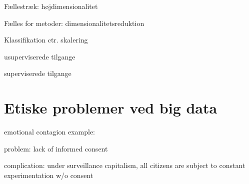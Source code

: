 \documentclass[12pt,]{article}
\begin{document}
Fællestræk: højdimensionalitet

Fælles for metoder: dimensionalitetsreduktion

Klassifikation ctr. skalering

usuperviserede tilgange

superviserede tilgange

\hypertarget{etiske-problemer-ved-big-data}{%
\section{Etiske problemer ved big
data}\label{etiske-problemer-ved-big-data}}

emotional contagion example: \citet{kramer2014experimental}

problem: lack of informed consent

complication: under surveillance capitalism, all citizens are subject to
constant experimentation w/o consent


\end{document}
